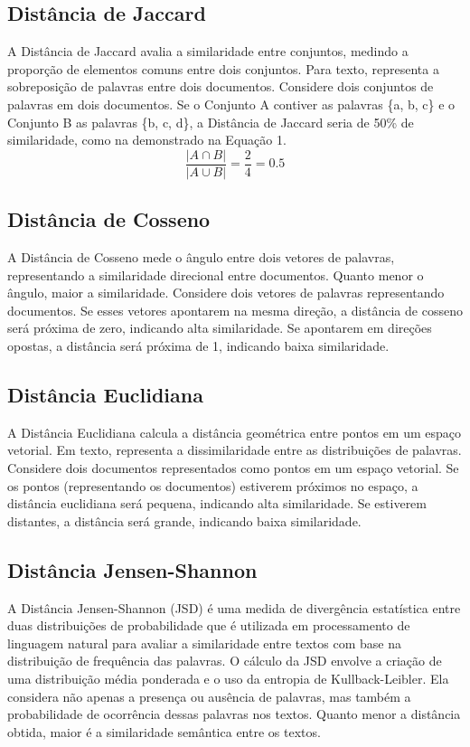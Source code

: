 \subsection{Distância de Jaccard}
A Distância de Jaccard avalia a similaridade entre conjuntos, medindo a proporção de elementos comuns entre dois conjuntos. Para texto, representa a sobreposição de palavras entre dois documentos. Considere dois conjuntos de palavras em dois documentos. Se o Conjunto A contiver as palavras \{a, b, c\} e o Conjunto B as palavras \{b, c, d\}, a Distância de Jaccard seria de 50\% de similaridade, como na demonstrado na Equação 1. 
\begin{equation}
\frac{|A \cap B|}{|A \cup B|} = \frac{2}{4} = 0.5
\end{equation}

\subsection{Distância de Cosseno}
A Distância de Cosseno mede o ângulo entre dois vetores de palavras, representando a similaridade direcional entre documentos. Quanto menor o ângulo, maior a similaridade. Considere dois vetores de palavras representando documentos. Se esses vetores apontarem na mesma direção, a distância de cosseno será próxima de zero, indicando alta similaridade. Se apontarem em direções opostas, a distância será próxima de 1, indicando baixa similaridade.

\subsection{Distância Euclidiana}
A Distância Euclidiana calcula a distância geométrica entre pontos em um espaço vetorial. Em texto, representa a dissimilaridade entre as distribuições de palavras. Considere dois documentos representados como pontos em um espaço vetorial. Se os pontos (representando os documentos) estiverem próximos no espaço, a distância euclidiana será pequena, indicando alta similaridade. Se estiverem distantes, a distância será grande, indicando baixa similaridade.

\subsection{Distância Jensen-Shannon}
A Distância Jensen-Shannon (JSD) é uma medida de divergência estatística entre duas distribuições de probabilidade que é utilizada em processamento de linguagem natural para avaliar a similaridade entre textos com base na distribuição de frequência das palavras. O cálculo da JSD envolve a criação de uma distribuição média ponderada e o uso da entropia de Kullback-Leibler. Ela considera não apenas a presença ou ausência de palavras, mas também a probabilidade de ocorrência dessas palavras nos textos. Quanto menor a distância obtida, maior é a similaridade semântica entre os textos.

